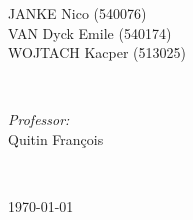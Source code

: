 \documentclass[a4paper, twoside, 12pt]{article}
\begin{document}
\begin{titlepage}
\begin{minipage}{0.4\textwidth}
\begin{flushleft}
			JANKE Nico (540076) \\ VAN Dyck Emile (540174) \\ WOJTACH Kacper (513025)
		\end{flushleft}
	\end{minipage}
	~
	\begin{minipage}{0.4\textwidth}
		\begin{flushright} \large
			\emph{Professor:} \\
			Quitin François
		\end{flushright}
	\end{minipage}\\[2cm]
	\makeatother



	{\large \today}\\[2cm] %


\end{titlepage}
\end{document}
